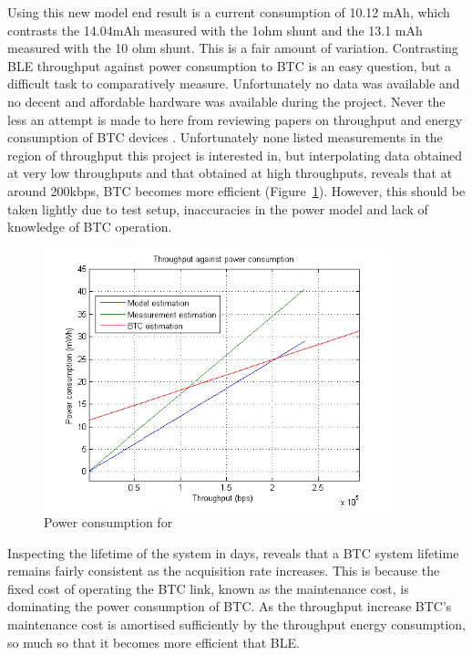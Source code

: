 \documentclass[]{article}
\begin{document}
Using this new model end result is a current consumption of 10.12 mAh, which contrasts the 14.04mAh measured with the 1ohm shunt and the 13.1 mAh measured with the 10 ohm shunt. This is a fair amount of variation. Contrasting \ac{BLE} throughput against power consumption to \ac{BTC} is an easy question, but a difficult task to comparatively measure. Unfortunately no data was available and no decent and affordable hardware was available during the project. Never the less an attempt is made to here from reviewing papers on throughput and energy consumption of \ac{BTC} devices \cite{juan} \cite{rahuli} \cite{roy} \cite{Siekkinen2012}. Unfortunately none listed measurements in the region of throughput this project is interested in, but interpolating data obtained at very low throughputs and that obtained at high throughputs, reveals that at around 200kbps, \ac{BTC} becomes more efficient (Figure~\ref{fig:powercon}). However, this should be taken lightly due to test setup, inaccuracies in the power model and lack of knowledge of \ac{BTC} operation.

\begin{figure}[H]
	\begin{center}
		\includegraphics[width = 0.9\textwidth]{powercon}
	\end{center}
	\caption{Power consumption for }
	\label{fig:powercon}
\end{figure}

Inspecting the lifetime of the system in days, reveals that a \ac{BTC} system lifetime remains fairly consistent as the acquisition rate increases. This is because the fixed cost of operating the \ac{BTC} link, known as the maintenance cost, is dominating the power consumption of \ac{BTC}. As the throughput increase \ac{BTC}'s maintenance cost is amortised sufficiently by the throughput energy consumption, so much so that it becomes more efficient that \ac{BLE}. 
\end{document}
